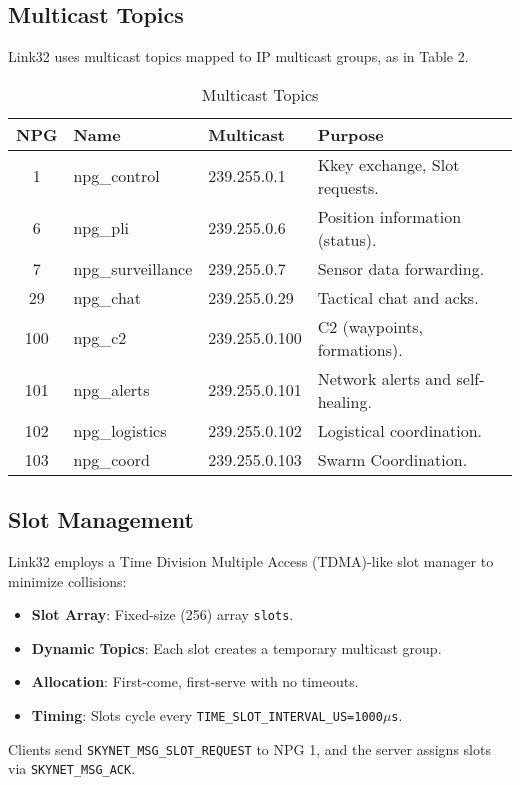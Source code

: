 \documentclass{article}
\begin{document}
\subsection{Multicast Topics}
Link32 uses multicast topics mapped to IP multicast groups, as in Table 2.

\begin{table}[h]
\centering
\caption{Multicast Topics}
\begin{tabular}{cllp{5cm}}
\hline
\textbf{NPG} & \textbf{Name} & \textbf{Multicast} & \textbf{Purpose} \\
\hline
1   & npg\_control      & 239.255.0.1   & Kkey exchange, Slot requests. \\
6   & npg\_pli          & 239.255.0.6   & Position information (status). \\
7   & npg\_surveillance & 239.255.0.7   & Sensor data forwarding. \\
29  & npg\_chat         & 239.255.0.29  & Tactical chat and acks. \\
100 & npg\_c2           & 239.255.0.100 & C2 (waypoints, formations). \\
101 & npg\_alerts       & 239.255.0.101 & Network alerts and self-healing. \\
102 & npg\_logistics    & 239.255.0.102 & Logistical coordination. \\
103 & npg\_coord        & 239.255.0.103 & Swarm Coordination. \\
\hline
\end{tabular}
\end{table}

\newpage
\subsection{Slot Management}
Link32 employs a Time Division Multiple Access (TDMA)-like slot manager to minimize collisions:
\begin{itemize}
    \item \textbf{Slot Array}: Fixed-size (256) array \texttt{slots}.
    \item \textbf{Dynamic Topics}: Each slot creates a temporary multicast group.
    \item \textbf{Allocation}: First-come, first-serve with no timeouts.
    \item \textbf{Timing}: Slots cycle every \texttt{TIME\_SLOT\_INTERVAL\_US=1000$\mu$s}.
\end{itemize}
Clients send \texttt{SKYNET\_MSG\_SLOT\_REQUEST} to NPG 1, and the server assigns slots via
\texttt{SKYNET\_MSG\_ACK}.
\end{document}
